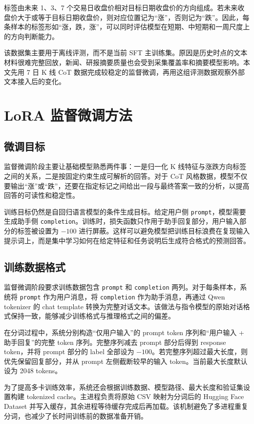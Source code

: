 标签由未来 1、3、7 个交易日收盘价相对目标日期收盘价的方向组成。若未来收盘价大于或等于目标日期收盘价，则对应位置记为“涨”，否则记为“跌”。因此，每条样本的标签形如“涨，跌，涨”，可以同时评估模型在短期、中短期和一周尺度上的方向判断能力。

该数据集主要用于离线评测，而不是当前 SFT 主训练集。原因是历史时点的文本材料很难完整回放，新闻、研报摘要质量也会受到采集覆盖率和摘要模型影响。本文先用 7 日 K 线 CoT 数据完成较稳定的监督微调，再用这组评测数据观察外部文本接入后的变化。

\section{LoRA 监督微调方法}

\subsection{微调目标}

监督微调阶段主要让基础模型熟悉两件事：一是归一化 K 线特征与涨跌方向标签之间的关系，二是按固定约束生成可解析的回答。对于 CoT 风格数据，模型不仅要输出“涨”或“跌”，还要在指定标记之间给出一段与最终答案一致的分析，以提高回答的可读性和稳定性。

训练目标仍然是自回归语言模型的条件生成目标。给定用户侧 \texttt{prompt}，模型需要生成助手侧 \texttt{completion}。训练时，损失函数只作用于助手回复部分，用户输入部分的标签被设置为 \(-100\) 进行屏蔽。这样可以避免模型把训练目标浪费在复现输入提示词上，而是集中学习如何在给定特征和任务说明后生成符合格式的预测回答。

\subsection{训练数据格式}

监督微调阶段要求训练数据包含 \texttt{prompt} 和 \texttt{completion} 两列。对于每条样本，系统将 \texttt{prompt} 作为用户消息，将 \texttt{completion} 作为助手消息，再通过 Qwen tokenizer 的 chat template 转换为完整对话文本。该做法与指令模型的原始对话格式保持一致，能够减少训练格式与推理格式之间的偏差。

在分词过程中，系统分别构造“仅用户输入”的 prompt token 序列和“用户输入 + 助手回复”的完整 token 序列。完整序列减去 prompt 部分后得到 response token，并将 prompt 部分的 label 全部设为 \(-100\)。若完整序列超过最大长度，则优先保留回复部分，并从 prompt 左侧截断较早的输入 token。当前最大长度默认设为 2048 tokens。

为了提高多卡训练效率，系统还会根据训练数据、模型路径、最大长度和验证集设置构建 tokenized cache。主进程负责将原始 CSV 映射为分词后的 Hugging Face Dataset 并写入缓存，其余进程等待缓存完成后再加载。该机制避免了多进程重复分词，也减少了长时间训练前的数据准备开销。

